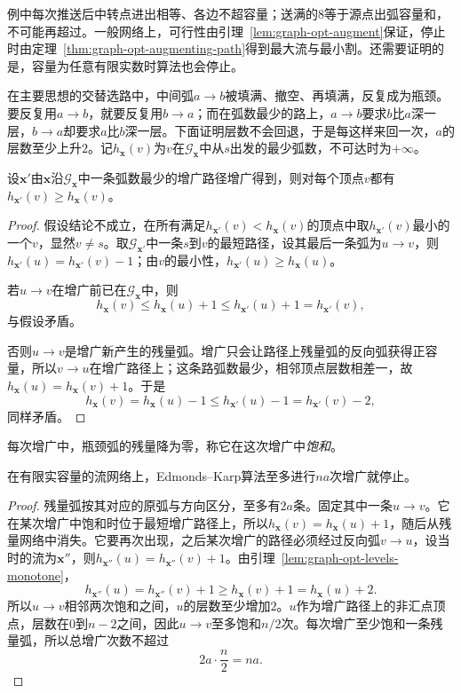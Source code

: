 例中每次推送后中转点进出相等、各边不超容量；送满的$8$等于源点出弧容量和，不可能再超过。一般网络上，可行性由引理~\ref{lem:graph-opt-augment}保证，停止时由定理~\ref{thm:graph-opt-augmenting-path}得到最大流与最小割。还需要证明的是，容量为任意有限实数时算法也会停止。

在主要思想的交替选路中，中间弧$a\to b$被填满、撤空、再填满，反复成为瓶颈。要反复用$a\to b$，就要反复用$b\to a$；而在弧数最少的路上，$a\to b$要求$b$比$a$深一层，$b\to a$却要求$a$比$b$深一层。下面证明层数不会回退，于是每这样来回一次，$a$的层数至少上升$2$。记$h_{\bm x}(v)$为$v$在$\mathcal G_{\bm x}$中从$s$出发的最少弧数，不可达时为$+\infty$。

\begin{lemma}[残量层数单调不减]
\label{lem:graph-opt-levels-monotone}
设$\bm x'$由$\bm x$沿$\mathcal G_{\bm x}$中一条弧数最少的增广路径增广得到，则对每个顶点$v$都有$h_{\bm x'}(v)\geq h_{\bm x}(v)$。
\end{lemma}

\begin{proof}
假设结论不成立，在所有满足$h_{\bm x'}(v)<h_{\bm x}(v)$的顶点中取$h_{\bm x'}(v)$最小的一个$v$，显然$v\neq s$。取$\mathcal G_{\bm x'}$中一条$s$到$v$的最短路径，设其最后一条弧为$u\to v$，则$h_{\bm x'}(u)=h_{\bm x'}(v)-1$；由$v$的最小性，$h_{\bm x'}(u)\geq h_{\bm x}(u)$。

若$u\to v$在增广前已在$\mathcal G_{\bm x}$中，则
\[
  h_{\bm x}(v)\leq h_{\bm x}(u)+1\leq h_{\bm x'}(u)+1=h_{\bm x'}(v),
\]
与假设矛盾。

否则$u\to v$是增广新产生的残量弧。增广只会让路径上残量弧的反向弧获得正容量，所以$v\to u$在增广路径上；这条路弧数最少，相邻顶点层数相差一，故$h_{\bm x}(u)=h_{\bm x}(v)+1$。于是
\[
  h_{\bm x}(v)=h_{\bm x}(u)-1\leq h_{\bm x'}(u)-1=h_{\bm x'}(v)-2,
\]
同样矛盾。
\end{proof}

每次增广中，瓶颈弧的残量降为零，称它在这次增广中\emph{饱和}。

\begin{theorem}
\label{thm:graph-opt-edmonds-karp}
在有限实容量的流网络上，Edmonds--Karp算法至多进行$na$次增广就停止。
\end{theorem}

\begin{proof}
残量弧按其对应的原弧与方向区分，至多有$2a$条。固定其中一条$u\to v$。它在某次增广中饱和时位于最短增广路径上，所以$h_{\bm x}(v)=h_{\bm x}(u)+1$，随后从残量网络中消失。它要再次出现，之后某次增广的路径必须经过反向弧$v\to u$，设当时的流为$\bm x''$，则$h_{\bm x''}(u)=h_{\bm x''}(v)+1$。由引理~\ref{lem:graph-opt-levels-monotone}，
\[
  h_{\bm x''}(u)=h_{\bm x''}(v)+1\geq h_{\bm x}(v)+1=h_{\bm x}(u)+2.
\]
所以$u\to v$相邻两次饱和之间，$u$的层数至少增加$2$。$u$作为增广路径上的非汇点顶点，层数在$0$到$n-2$之间，因此$u\to v$至多饱和$n/2$次。每次增广至少饱和一条残量弧，所以总增广次数不超过
\[
  2a\cdot\frac n2=na.
\]
\end{proof}

